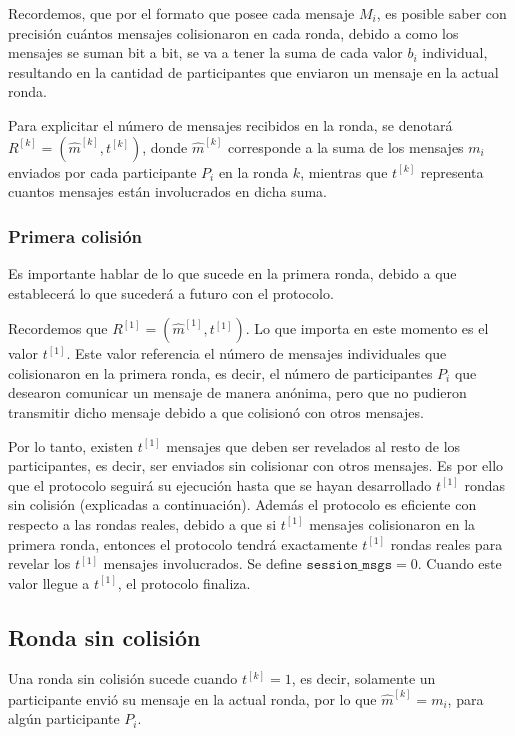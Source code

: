 Recordemos, que por el formato que posee cada mensaje $M_i$, es posible saber 
con precisión cuántos mensajes colisionaron en cada ronda, debido a como los 
mensajes se suman bit a bit, se va a tener la suma de cada valor $b_i$ 
individual, resultando en la cantidad de participantes que enviaron un mensaje 
en la actual ronda.

Para explicitar el número de mensajes recibidos en la ronda, se denotará 
$R^{[k]} = (\hat{m}^{[k]}, t^{[k]})$, donde $\hat{m}^{[k]}$ corresponde a la 
suma de los mensajes $m_i$ enviados por cada participante $P_i$ en la ronda 
$k$, mientras que $t^{[k]}$ representa cuantos mensajes están involucrados en 
dicha suma.

\subsubsection{Primera colisión}

Es importante hablar de lo que sucede en la primera ronda, debido a que 
establecerá lo que sucederá a futuro con el protocolo.

Recordemos que $R^{[1]} = (\hat{m}^{[1]}, t^{[1]})$. Lo que importa en este 
momento es el valor $t^{[1]}$. Este valor referencia el número de mensajes 
individuales que colisionaron en la primera ronda, es decir, el número de 
participantes $P_i$ que desearon comunicar un mensaje de manera anónima, pero 
que no pudieron transmitir dicho mensaje debido a que colisionó con otros 
mensajes.

Por lo tanto, existen $t^{[1]}$ mensajes que deben ser revelados al resto de 
los participantes, es decir, ser enviados sin colisionar con otros mensajes. 
Es por ello que el protocolo seguirá su ejecución hasta que se hayan 
desarrollado $t^{[1]}$ rondas sin colisión (explicadas a continuación). Además 
el protocolo es eficiente con respecto a las rondas reales, debido a que si 
$t^{[1]}$ mensajes colisionaron en la primera ronda, entonces el 
protocolo tendrá exactamente $t^{[1]}$ rondas reales para revelar los $t^{[1]}$
mensajes involucrados. Se define $\mathtt{session\_msgs} = 0$. Cuando este 
valor llegue a $t^{[1]}$, el protocolo finaliza.

\subsection{Ronda sin colisión}

Una ronda sin colisión sucede cuando $t^{[k]} = 1$, es decir, solamente un 
participante envió su mensaje en la actual ronda, por lo que 
$\hat{m}^{[k]} = m_i$, para algún participante $P_i$.

